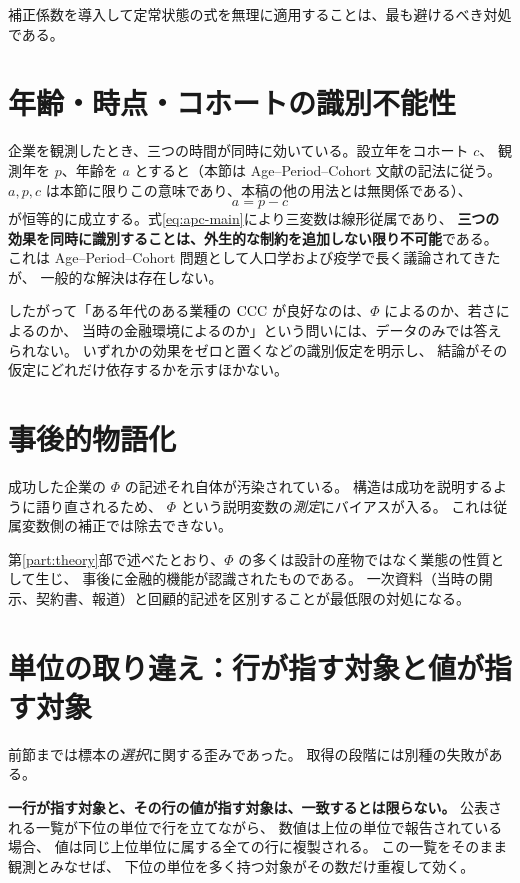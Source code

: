 補正係数を導入して定常状態の式を無理に適用することは、最も避けるべき対処である。

\section{年齢・時点・コホートの識別不能性}
\label{sec:apc}

企業を観測したとき、三つの時間が同時に効いている。設立年をコホート $c$、
観測年を $p$、年齢を $a$ とすると（本節は Age--Period--Cohort 文献の記法に従う。
$a,p,c$ は本節に限りこの意味であり、本稿の他の用法とは無関係である）、
\begin{equation}
a = p - c
\label{eq:apc-main}
\end{equation}
が恒等的に成立する。式\eqref{eq:apc-main}により三変数は線形従属であり、
\textbf{三つの効果を同時に識別することは、外生的な制約を追加しない限り不可能}である。
これは Age--Period--Cohort 問題として人口学および疫学で長く議論されてきたが、
一般的な解決は存在しない。

したがって「ある年代のある業種の $\mathrm{CCC}$ が良好なのは、$\Phi$ によるのか、若さによるのか、
当時の金融環境によるのか」という問いには、データのみでは答えられない。
いずれかの効果をゼロと置くなどの識別仮定を明示し、
結論がその仮定にどれだけ依存するかを示すほかない。

\section{事後的物語化}
\label{sec:narrative}

成功した企業の $\Phi$ の記述それ自体が汚染されている。
構造は成功を説明するように語り直されるため、
$\Phi$ という説明変数の\emph{測定}にバイアスが入る。
これは従属変数側の補正では除去できない。

第\ref{part:theory}部で述べたとおり、$\Phi$ の多くは設計の産物ではなく業態の性質として生じ、
事後に金融的機能が認識されたものである。
一次資料（当時の開示、契約書、報道）と回顧的記述を区別することが最低限の対処になる。

\section{単位の取り違え：行が指す対象と値が指す対象}
\label{sec:misidentification}

前節までは標本の\emph{選択}に関する歪みであった。
取得の段階には別種の失敗がある。

\textbf{一行が指す対象と、その行の値が指す対象は、一致するとは限らない。}
公表される一覧が下位の単位で行を立てながら、
数値は上位の単位で報告されている場合、
値は同じ上位単位に属する全ての行に複製される。
この一覧をそのまま観測とみなせば、
下位の単位を多く持つ対象がその数だけ重複して効く。

